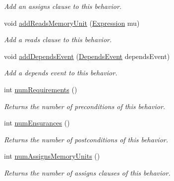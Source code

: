 \begin{DoxyCompactItemize}
\begin{DoxyCompactList}\small\item\em Add an assigns clause to this behavior. \end{DoxyCompactList}\item 
void \hyperlink{interfaceedu_1_1udel_1_1cis_1_1vsl_1_1civl_1_1model_1_1IF_1_1contract_1_1FunctionBehavior_a827de032920a57af4877502c185fe1a0}{add\+Reads\+Memory\+Unit} (\hyperlink{interfaceedu_1_1udel_1_1cis_1_1vsl_1_1civl_1_1model_1_1IF_1_1expression_1_1Expression}{Expression} mu)
\begin{DoxyCompactList}\small\item\em Add a reads clause to this behavior. \end{DoxyCompactList}\item 
void \hyperlink{interfaceedu_1_1udel_1_1cis_1_1vsl_1_1civl_1_1model_1_1IF_1_1contract_1_1FunctionBehavior_a43eb2c62be669c1348fcd08574c168ce}{add\+Depends\+Event} (\hyperlink{interfaceedu_1_1udel_1_1cis_1_1vsl_1_1civl_1_1model_1_1IF_1_1contract_1_1DependsEvent}{Depends\+Event} depends\+Event)
\begin{DoxyCompactList}\small\item\em Add a depends event to this behavior. \end{DoxyCompactList}\item 
int \hyperlink{interfaceedu_1_1udel_1_1cis_1_1vsl_1_1civl_1_1model_1_1IF_1_1contract_1_1FunctionBehavior_a3a8c39af99c9e0c044e8cb92f0e9e332}{num\+Requirements} ()
\begin{DoxyCompactList}\small\item\em Returns the number of preconditions of this behavior. \end{DoxyCompactList}\item 
int \hyperlink{interfaceedu_1_1udel_1_1cis_1_1vsl_1_1civl_1_1model_1_1IF_1_1contract_1_1FunctionBehavior_ad0fd6d7a0ae1f0c9e2f4cf304bcbdedf}{num\+Ensurances} ()
\begin{DoxyCompactList}\small\item\em Returns the number of postconditions of this behavior. \end{DoxyCompactList}\item 
int \hyperlink{interfaceedu_1_1udel_1_1cis_1_1vsl_1_1civl_1_1model_1_1IF_1_1contract_1_1FunctionBehavior_a20560c108ae098e7dc47b62b3c1d1fe9}{num\+Assigns\+Memory\+Units} ()
\begin{DoxyCompactList}\small\item\em Returns the number of assigns clauses of this behavior. \end{DoxyCompactList}\item 

\end{DoxyCompactItemize}
